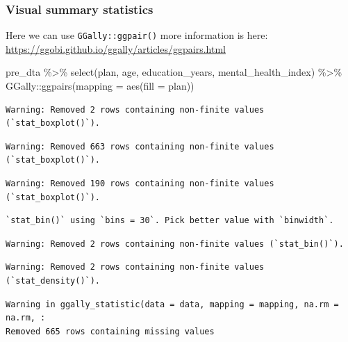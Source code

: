\documentclass[
  letterpaper,
  DIV=11,
  numbers=noendperiod]{scrartcl}
\newenvironment{Shaded}{\begin{snugshade}}{\end{snugshade}}
\newcommand{\AttributeTok}[1]{\textcolor[rgb]{0.40,0.45,0.13}{#1}}
\newcommand{\FunctionTok}[1]{\textcolor[rgb]{0.28,0.35,0.67}{#1}}
\newcommand{\NormalTok}[1]{\textcolor[rgb]{0.00,0.23,0.31}{#1}}
\newcommand{\SpecialCharTok}[1]{\textcolor[rgb]{0.37,0.37,0.37}{#1}}
\begin{document}
\hypertarget{visual-summary-statistics}{%
\subsubsection{Visual summary
statistics}\label{visual-summary-statistics}}

Here we can use \texttt{GGally::ggpair()} more information is here:
\url{https://ggobi.github.io/ggally/articles/ggpairs.html}

\begin{Shaded}
\begin{Highlighting}[]
\NormalTok{pre\_dta }\SpecialCharTok{\%\textgreater{}\%} 
  \FunctionTok{select}\NormalTok{(plan, age, education\_years, mental\_health\_index) }\SpecialCharTok{\%\textgreater{}\%} 
\NormalTok{  GGally}\SpecialCharTok{::}\FunctionTok{ggpairs}\NormalTok{(}\AttributeTok{mapping =} \FunctionTok{aes}\NormalTok{(}\AttributeTok{fill =}\NormalTok{ plan)) }
\end{Highlighting}
\end{Shaded}

\begin{verbatim}
Warning: Removed 2 rows containing non-finite values (`stat_boxplot()`).
\end{verbatim}

\begin{verbatim}
Warning: Removed 663 rows containing non-finite values (`stat_boxplot()`).
\end{verbatim}

\begin{verbatim}
Warning: Removed 190 rows containing non-finite values (`stat_boxplot()`).
\end{verbatim}

\begin{verbatim}
`stat_bin()` using `bins = 30`. Pick better value with `binwidth`.
\end{verbatim}

\begin{verbatim}
Warning: Removed 2 rows containing non-finite values (`stat_bin()`).
\end{verbatim}

\begin{verbatim}
Warning: Removed 2 rows containing non-finite values (`stat_density()`).
\end{verbatim}

\begin{verbatim}
Warning in ggally_statistic(data = data, mapping = mapping, na.rm = na.rm, :
Removed 665 rows containing missing values
\end{verbatim}
\end{document}
